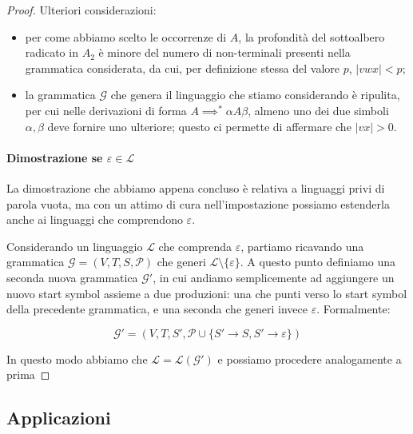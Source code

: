 \documentclass[class=book, crop=false, oneside, 12pt]{standalone}
\begin{document}
\begin{proof}
  Ulteriori considerazioni:
   \begin{itemize}
     \item per come abbiamo scelto le occorrenze di \(A\), la profondità del sottoalbero radicato in \(A_2\) è minore del numero di non-terminali presenti nella grammatica considerata, da cui, per definizione stessa del valore \(p\), \(|vwx| < p\);
     \item la grammatica \(\mathcal{G}\) che genera il linguaggio che stiamo considerando è ripulita, per cui nelle derivazioni di forma \(A \implies^* \alpha A \beta\), almeno uno dei due simboli \(\alpha, \beta\) deve fornire uno ulteriore; questo ci permette di affermare che \(|vx| > 0\).
   \end{itemize}

   \paragraph{Dimostrazione se \(\varepsilon \in \mathcal{L}\)}
   La dimostrazione che abbiamo appena concluso è relativa a linguaggi privi di parola vuota, ma con un attimo di cura nell'impostazione possiamo estenderla anche ai linguaggi che comprendono \(\varepsilon\).

   Considerando un linguaggio \(\mathcal{L}\) che comprenda \(\varepsilon\), partiamo ricavando una grammatica \(\mathcal{G} = (V, T, S, \mathcal{P})\) che generi \(\mathcal{L} \setminus \{\varepsilon\}\). A questo punto definiamo una seconda nuova grammatica \(\mathcal{G}'\), in cui andiamo semplicemente ad aggiungere un nuovo start symbol assieme a due produzioni: una che punti verso lo start symbol della precedente grammatica, e una seconda che generi invece \(\varepsilon\). Formalmente:

   \begin{equation*}
     \mathcal{G}' = (V, T, S', \mathcal{P} \cup \{ S' \rightarrow S, S' \rightarrow \varepsilon \})
   \end{equation*}

   In questo modo abbiamo che \(\mathcal{L} = \mathcal{L(G')}\) e possiamo procedere analogamente a prima

\end{proof}

\subsection{Applicazioni}
\end{document}
